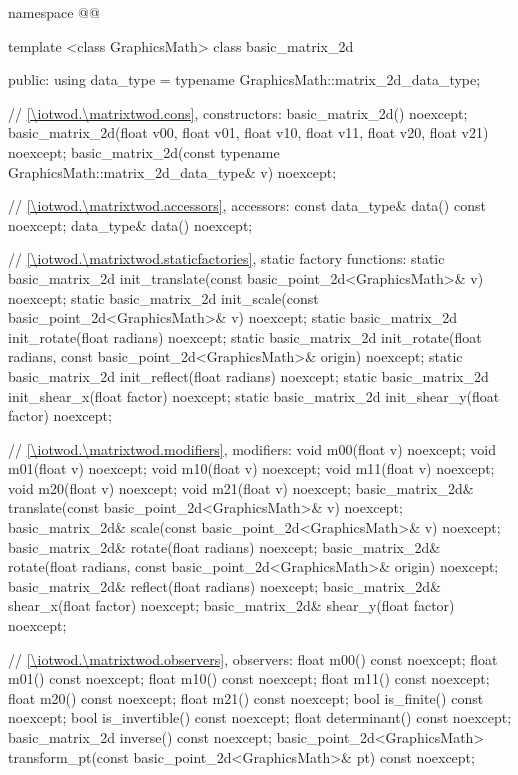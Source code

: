 \begin{codeblock}
namespace @\fullnamespace{}@ {
  template <class GraphicsMath>
  class basic_matrix_2d {
  public:
    using data_type = typename GraphicsMath::matrix_2d_data_type;
    
    // \ref{\iotwod.\matrixtwod.cons}, constructors:
    basic_matrix_2d() noexcept;
    basic_matrix_2d(float v00, float v01, float v10, float v11, float v20, float v21) noexcept;
    basic_matrix_2d(const typename GraphicsMath::matrix_2d_data_type& v) noexcept;

    // \ref{\iotwod.\matrixtwod.accessors}, accessors:
    const data_type& data() const noexcept;
    data_type& data() noexcept;

    // \ref{\iotwod.\matrixtwod.staticfactories}, static factory functions:
    static basic_matrix_2d init_translate(const basic_point_2d<GraphicsMath>& v) noexcept;
    static basic_matrix_2d init_scale(const basic_point_2d<GraphicsMath>& v) noexcept;
    static basic_matrix_2d init_rotate(float radians) noexcept;
    static basic_matrix_2d init_rotate(float radians,
      const basic_point_2d<GraphicsMath>& origin) noexcept;
    static basic_matrix_2d init_reflect(float radians) noexcept;
    static basic_matrix_2d init_shear_x(float factor) noexcept;
    static basic_matrix_2d init_shear_y(float factor) noexcept;

    // \ref{\iotwod.\matrixtwod.modifiers}, modifiers:
    void m00(float v) noexcept;
    void m01(float v) noexcept;
    void m10(float v) noexcept;
    void m11(float v) noexcept;
    void m20(float v) noexcept;
    void m21(float v) noexcept;
    basic_matrix_2d& translate(const basic_point_2d<GraphicsMath>& v) noexcept;
    basic_matrix_2d& scale(const basic_point_2d<GraphicsMath>& v) noexcept;
    basic_matrix_2d& rotate(float radians) noexcept;
    basic_matrix_2d& rotate(float radians, const basic_point_2d<GraphicsMath>& origin) noexcept;
    basic_matrix_2d& reflect(float radians) noexcept;
    basic_matrix_2d& shear_x(float factor) noexcept;
    basic_matrix_2d& shear_y(float factor) noexcept;

    // \ref{\iotwod.\matrixtwod.observers}, observers:
    float m00() const noexcept;
    float m01() const noexcept;
    float m10() const noexcept;
    float m11() const noexcept;
    float m20() const noexcept;
    float m21() const noexcept;
    bool is_finite() const noexcept;
    bool is_invertible() const noexcept;
    float determinant() const noexcept;
    basic_matrix_2d inverse() const noexcept;
    basic_point_2d<GraphicsMath> transform_pt(const basic_point_2d<GraphicsMath>& pt)
      const noexcept;

}}
\end{codeblock}
